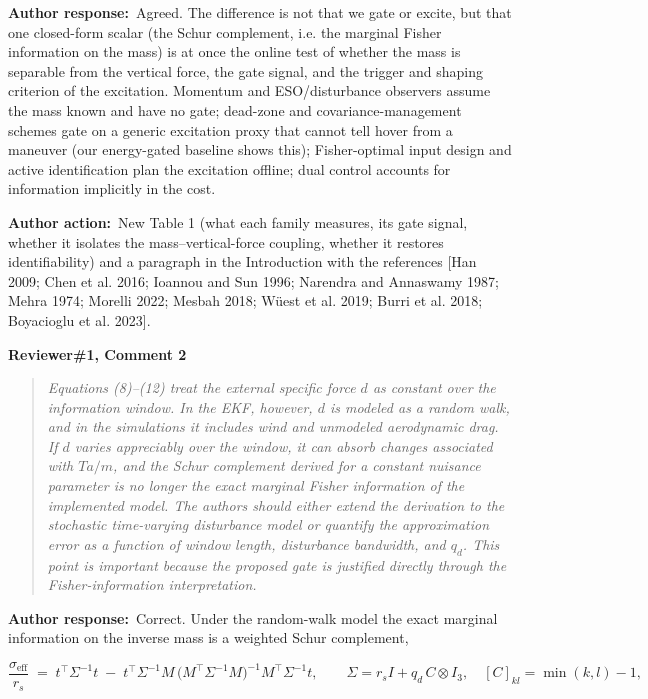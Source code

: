 \documentclass[11pt]{article}
\newcommand{\concern}[1]{\par\medskip\noindent\colorbox{gray!12}{\parbox{\dimexpr\linewidth-2\fboxsep}{\textbf{#1}}}\par\smallskip}
\newcommand{\rlabel}[1]{\par\textbf{#1}\ }
\begin{document}
\rlabel{Author response:}Agreed. The difference is not that we gate or excite, but that one closed-form scalar (the Schur complement, i.e. the marginal Fisher information on the mass) is at once the online test of whether the mass is separable from the vertical force, the gate signal, and the trigger and shaping criterion of the excitation. Momentum and ESO/disturbance observers assume the mass known and have no gate; dead-zone and covariance-management schemes gate on a generic excitation proxy that cannot tell hover from a maneuver (our energy-gated baseline shows this); Fisher-optimal input design and active identification plan the excitation offline; dual control accounts for information implicitly in the cost.

\rlabel{Author action:}New Table 1 (what each family measures, its gate signal, whether it isolates the mass--vertical-force coupling, whether it restores identifiability) and a paragraph in the Introduction with the references [Han 2009; Chen et al. 2016; Ioannou and Sun 1996; Narendra and Annaswamy 1987; Mehra 1974; Morelli 2022; Mesbah 2018; W\"uest et al. 2019; Burri et al. 2018; Boyacioglu et al. 2023].

\concern{Reviewer\#1, Comment 2}

\begin{quote}\itshape Equations (8)--(12) treat the external specific force $d$ as constant over the information window. In the EKF, however, $d$ is modeled as a random walk, and in the simulations it includes wind and unmodeled aerodynamic drag. If $d$ varies appreciably over the window, it can absorb changes associated with $T a/m$, and the Schur complement derived for a constant nuisance parameter is no longer the exact marginal Fisher information of the implemented model. The authors should either extend the derivation to the stochastic time-varying disturbance model or quantify the approximation error as a function of window length, disturbance bandwidth, and $q_d$. This point is important because the proposed gate is justified directly through the Fisher-information interpretation.\end{quote}

\rlabel{Author response:}Correct. Under the random-walk model the exact marginal information on the inverse mass is a weighted Schur complement,

\[\frac{\sigma_{\mathrm{eff}}}{r_s} \;=\; t^{\top}\Sigma^{-1}t \;-\; t^{\top}\Sigma^{-1}M\,\bigl(M^{\top}\Sigma^{-1}M\bigr)^{-1}M^{\top}\Sigma^{-1}t, \qquad \Sigma = r_s I + q_d\, C \otimes I_3,\quad [C]_{kl} = \min(k,l) - 1,\]
\end{document}
